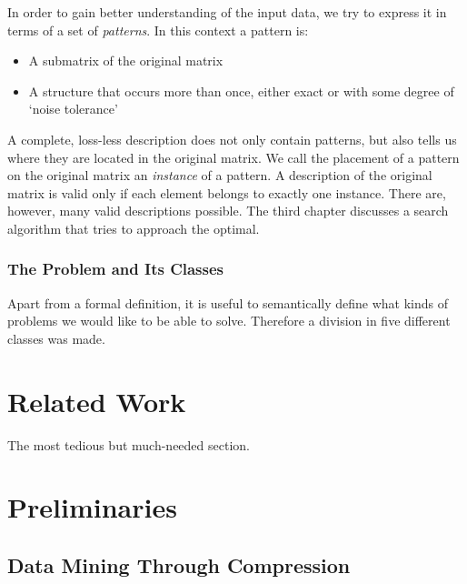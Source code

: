 \documentclass[a4paper,notoc,oneside]{tufte-book}
\begin{document}
In order to gain better understanding of the input data, we try to express it in terms of a set of \emph{patterns}. In this context a pattern is:
\begin{itemize}
\item A submatrix of the original matrix
\item A structure that occurs more than once, either exact or with some degree of `noise tolerance'
\end{itemize} 
A complete, loss-less description does not only contain patterns, but also tells us where they are located in the original matrix. We call the placement of a pattern on the original matrix an \emph{instance} of a pattern. A description of the original matrix is valid only if each element belongs to exactly one instance. There are, however, many valid descriptions possible. The third chapter discusses a search algorithm that tries to approach the optimal.

\subsection{The Problem and Its Classes}

Apart from a formal definition, it is useful to semantically define what kinds of problems we would like to be able to solve. Therefore a division in five different classes was made.

\chapter{Related Work}

The most tedious but much-needed section.

\chapter{Preliminaries}

\section{Data Mining Through Compression}
\end{document}
